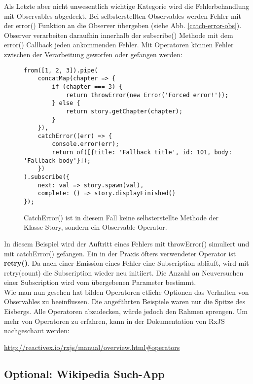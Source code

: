 \noindent
Als Letzte aber nicht unwesentlich wichtige Kategorie wird die Fehlerbehandlung mit Observables abgedeckt. Bei selbsterstellten Observables werden Fehler mit der error() Funktion an die Observer übergeben (siehe Abb. \ref{catch-error-obs}). Observer verarbeiten daraufhin innerhalb der subscribe() Methode mit dem error() Callback jeden ankommenden Fehler. Mit Operatoren können Fehler zwischen der Verarbeitung geworfen oder gefangen werden:

\begin{figure}[H]
\begin{lstlisting}[basicstyle=\small]
from([1, 2, 3]).pipe(
    concatMap(chapter => {
        if (chapter === 3) {
            return throwError(new Error('Forced error!'));
        } else {
            return story.getChapter(chapter);
        }
    }),
    catchError((err) => {
        console.error(err);
        return of([{title: 'Fallback title', id: 101, body: 'Fallback body'}]);
    })
).subscribe({
    next: val => story.spawn(val),
    complete: () => story.displayFinished()
});
\end{lstlisting}
\caption{CatchError() ist in diesem Fall keine selbsterstellte Methode der Klasse Story, sondern ein Observable Operator.}
\end{figure}

\noindent
In diesem Beispiel wird der Auftritt eines Fehlers mit throwError() simuliert und mit catchError() gefangen. Ein in der Praxis öfters verwendeter Operator ist \textbf{retry()}. Da nach einer Emission eines Fehler eine Subscription abläuft, wird mit retry(count) die Subscription wieder neu initiiert. Die Anzahl an Neuversuchen einer Subscription wird vom übergebenen Parameter bestimmt.\\

\noindent
Wie man nun gesehen hat bilden Operatoren etliche Optionen das Verhalten von Observables zu beeinflussen. Die angeführten Beispiele waren nur die Spitze des Eisbergs. Alle Operatoren abzudecken, würde jedoch den Rahmen sprengen. Um mehr von Operatoren zu erfahren, kann in der Dokumentation von RxJS nachgeschaut werden:

\begin{center}
\url{http://reactivex.io/rxjs/manual/overview.html#operators} 
\end{center}

\subsection{Optional: Wikipedia Such-App}

